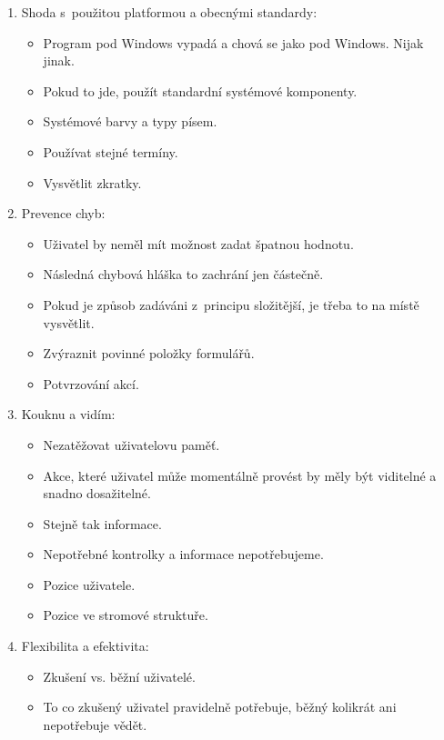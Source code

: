 \begin{enumerate}
\begin{itemize}
        \end{itemize}
    \item Shoda s~použitou platformou a obecnými standardy:
        \begin{itemize}
            \item Program pod Windows vypadá a chová se jako pod Windows. Nijak jinak.
            \item Pokud to jde, použít standardní systémové komponenty.
            \item Systémové barvy a typy písem.
            \item Používat stejné termíny.
            \item Vysvětlit zkratky.
        \end{itemize}
    \item Prevence chyb:
        \begin{itemize}
            \item Uživatel by neměl mít možnost zadat špatnou hodnotu.
            \item Následná chybová hláška to zachrání jen částečně.
            \item Pokud je způsob zadáváni z~principu složitější, je třeba to na místě vysvětlit.
            \item Zvýraznit povinné položky formulářů.
            \item Potvrzování akcí.
        \end{itemize}
    \item Kouknu a vidím:
        \begin{itemize}
            \item Nezatěžovat uživatelovu paměť.
            \item Akce, které uživatel může momentálně provést by měly být viditelné a snadno dosažitelné.
            \item Stejně tak informace.
            \item Nepotřebné kontrolky a informace nepotřebujeme.
            \item Pozice uživatele.
            \item Pozice ve stromové struktuře.
        \end{itemize}
    \item Flexibilita a efektivita:
        \begin{itemize}
            \item Zkušení vs. běžní uživatelé.
            \item To co zkušený uživatel pravidelně potřebuje, běžný kolikrát ani nepotřebuje vědět.

\end{itemize}
\end{enumerate}
